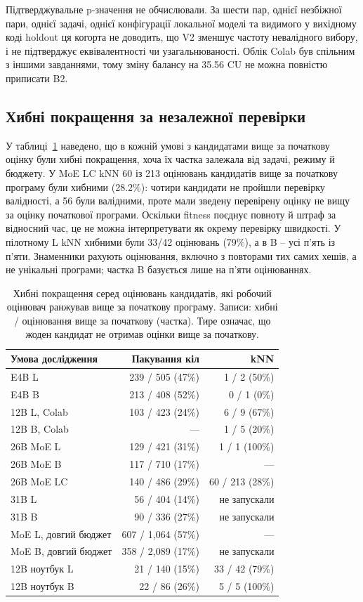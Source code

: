 \documentclass[11pt]{article}
\begin{document}
Підтверджувальне p-значення не обчислювали. За шести пар, однієї незбіжної пари, однієї задачі, однієї конфігурації локальної моделі та видимого у вихідному коді holdout ця когорта не доводить, що V2 зменшує частоту невалідного вибору, і не підтверджує еквівалентності чи узагальнюваності. Облік Colab був спільним з іншими завданнями, тому зміну балансу на 35.56 CU не можна повністю приписати B2.

\subsection{Хибні покращення за незалежної перевірки}

У таблиці~\ref{tab:false} наведено, що в кожній умові з кандидатами вище за початкову оцінку були хибні покращення, хоча їх частка залежала від задачі, режиму й бюджету. У MoE LC kNN 60 із 213 оцінювань кандидатів вище за початкову програму були хибними (28.2\%): чотири кандидати не пройшли перевірку валідності, а 56 були валідними, проте мали зведену перевірену оцінку не вищу за оцінку початкової програми. Оскільки fitness поєднує повноту й штраф за відносний час, це не можна інтерпретувати як окрему перевірку швидкості. У пілотному L kNN хибними були 33/42 оцінювань (79\%), а в B -- усі п'ять із п'яти. Знаменники рахують оцінювання, включно з повторами тих самих хешів, а не унікальні програми; частка B базується лише на п'яти оцінюваннях.

\begin{table}[tb]
\centering\small
\caption{Хибні покращення серед оцінювань кандидатів, які робочий оцінювач ранжував вище за початкову програму. Записи: хибні / оцінювання вище за початкову (частка). Тире означає, що жоден кандидат не отримав оцінки вище за початкову.}
\label{tab:false}
\begin{tabularx}{\linewidth}{@{}lrr@{}}
\toprule
Умова дослідження & Пакування кіл & kNN \\
\midrule
E4B L & 239 / 505 (47\%) & 1 / 2 (50\%) \\
E4B B & 213 / 408 (52\%) & 0 / 1 (0\%) \\
12B L, Colab & 103 / 423 (24\%) & 6 / 9 (67\%) \\
12B B, Colab & --- & 1 / 5 (20\%) \\
26B MoE L & 129 / 421 (31\%) & 1 / 1 (100\%) \\
26B MoE B & 117 / 710 (17\%) & --- \\
26B MoE LC & 140 / 486 (29\%) & 60 / 213 (28\%) \\
31B L & 56 / 404 (14\%) & не запускали \\
31B B & 90 / 336 (27\%) & не запускали \\
MoE L, довгий бюджет & 607 / 1{,}064 (57\%) & --- \\
MoE B, довгий бюджет & 358 / 2{,}089 (17\%) & не запускали \\
12B ноутбук L & 21 / 140 (15\%) & 33 / 42 (79\%) \\
12B ноутбук B & 22 / 86 (26\%) & 5 / 5 (100\%) \\
\bottomrule
\end{tabularx}
\end{table}
\end{document}
